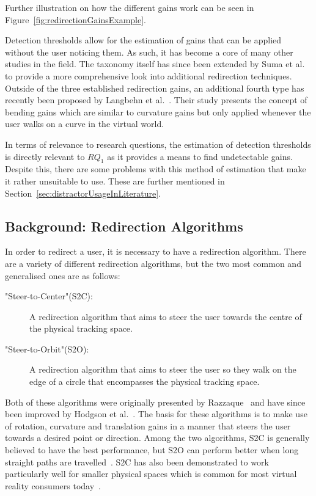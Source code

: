 Further illustration on how the different gains work can be seen in Figure~\ref{fig:redirectionGainsExample}.

Detection thresholds allow for the estimation of gains that can be applied without the user noticing them. As such, it has become a core of many other studies in the field. The taxonomy itself has since been extended by Suma et al.~\cite{suma2012taxonomy} to provide a more comprehensive look into additional redirection techniques. Outside of the three established redirection gains, an additional fourth type has recently been proposed by Langbehn et al.~\cite{7833190}. Their study presents the concept of bending gains which are similar to curvature gains but only applied whenever the user walks on a curve in the virtual world. 

In terms of relevance to research questions, the estimation of detection thresholds is directly relevant to $RQ_1$ as it provides a means to find undetectable gains. Despite this, there are some problems with this method of estimation that make it rather unsuitable to use. These are further mentioned in Section~\ref{sec:distractorUsageInLiterature}.

\subsection{Background: Redirection Algorithms}
In order to redirect a user, it is necessary to have a redirection algorithm. There are a variety of different redirection algorithms, but the two most common and generalised ones are as follows:
\begin{description}
    \item["Steer-to-Center"(S2C): ] A redirection algorithm that aims to steer the user towards the centre of the physical tracking space.
    \item["Steer-to-Orbit"(S2O): ] A redirection algorithm that aims to steer the user so they walk on the edge of a circle that encompasses the physical tracking space.
\end{description}
Both of these algorithms were originally presented by Razzaque~\cite{razzaque2005redirected} and have since been improved by Hodgson et al.~\cite{hodgson2013comparing}. The basis for these algorithms is to make use of rotation, curvature and translation gains in a manner that steers the user towards a desired point or direction. Among the two algorithms, S2C is generally believed to have the best performance, but S2O can perform better when long straight paths are travelled~\cite{hodgson2013comparing}. S2C has also been demonstrated to work particularly well for smaller physical spaces which is common for most virtual reality consumers today~\cite{azmandian2015physical}. 

